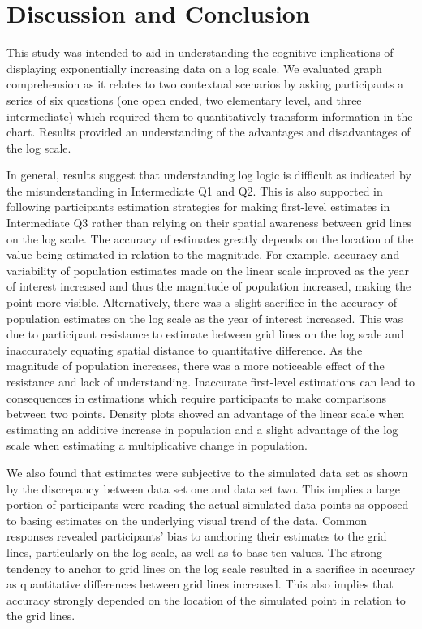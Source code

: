 \documentclass[print]{nuthesis}
\begin{document}
\hypertarget{discussion-and-conclusion-2}{%
\section{Discussion and Conclusion}\label{discussion-and-conclusion-2}}

This study was intended to aid in understanding the cognitive implications of displaying exponentially increasing data on a log scale.
We evaluated graph comprehension as it relates to two contextual scenarios by asking participants a series of six questions (one open ended, two elementary level, and three intermediate) which required them to quantitatively transform information in the chart.
Results provided an understanding of the advantages and disadvantages of the log scale.

In general, results suggest that understanding log logic is difficult as indicated by the misunderstanding in Intermediate Q1 and Q2.
This is also supported in following participants estimation strategies for making first-level estimates in Intermediate Q3 rather than relying on their spatial awareness between grid lines on the log scale.
The accuracy of estimates greatly depends on the location of the value being estimated in relation to the magnitude.
For example, accuracy and variability of population estimates made on the linear scale improved as the year of interest increased and thus the magnitude of population increased, making the point more visible.
Alternatively, there was a slight sacrifice in the accuracy of population estimates on the log scale as the year of interest increased.
This was due to participant resistance to estimate between grid lines on the log scale and inaccurately equating spatial distance to quantitative difference.
As the magnitude of population increases, there was a more noticeable effect of the resistance and lack of understanding.
Inaccurate first-level estimations can lead to consequences in estimations which require participants
to make comparisons between two points.
Density plots showed an advantage of the linear scale when estimating an additive increase in population and a slight advantage of the log scale when estimating a multiplicative change in population.

We also found that estimates were subjective to the simulated data set as shown by the discrepancy between data set one and data set two.
This implies a large portion of participants were reading the actual simulated data points as opposed to basing estimates on the underlying visual trend of the data.
Common responses revealed participants' bias to anchoring their estimates to the grid lines, particularly on the log scale, as well as to base ten values.
The strong tendency to anchor to grid lines on the log scale resulted in a sacrifice in accuracy as quantitative differences between grid lines increased.
This also implies that accuracy strongly depended on the location of the simulated point in relation to the grid lines.
\end{document}

